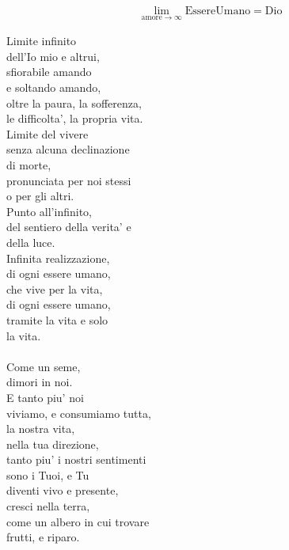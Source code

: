 \begin{vcentered}

    \begin{align*}
        &\lim_{\textrm{amore}\to\infty} \textrm{EssereUmano} = \textrm{Dio}
    \end{align*}

    \begin{poem}
        Limite infinito \\
        dell'Io mio e altrui,\\
        sfiorabile amando \\
        e soltando amando,\\
        oltre la paura, la sofferenza,\\
        le difficolta', la propria vita.\\
        Limite del vivere\\
        senza alcuna declinazione\\
        di morte,\\
        pronunciata per noi stessi\\
        o per gli altri.\\
        Punto all'infinito,\\
        del sentiero della verita' e\\
        della luce.\\
        Infinita realizzazione,\\
        di ogni essere umano,\\
        che vive per la vita,\\
        di ogni essere umano,\\
        tramite la vita e solo\\
        la vita.\\
        \leavevmode\\
        Come un seme,\\
        dimori in noi.\\
        E tanto piu' noi\\
        viviamo, e consumiamo tutta,\\
        la nostra vita,\\
        nella tua direzione,\\
        tanto piu' i nostri sentimenti\\
        sono i Tuoi, e Tu\\
        diventi vivo e presente,\\
        cresci nella terra,\\
        come un albero in cui trovare\\
        frutti, e riparo.\\
    \end{poem}

\end{vcentered}

